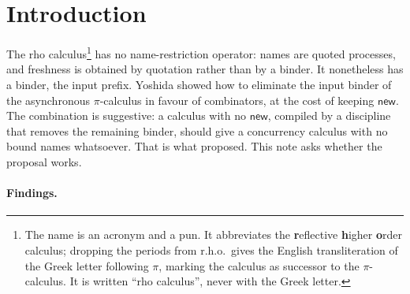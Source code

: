 \documentclass[11pt]{article}
\theoremstyle{plain}
\theoremstyle{definition}
\theoremstyle{remark}
\begin{document}
\tableofcontents

\section{Introduction}
\label{sec:intro}

The rho calculus\footnote{The name is an acronym and a pun. It abbreviates the
\textbf{r}eflective \textbf{h}igher \textbf{o}rder calculus; dropping the
periods from r.h.o.\ gives the English transliteration of the Greek letter
following $\pi$, marking the calculus as successor to the $\pi$-calculus. It
is written ``rho calculus'', never with the Greek letter.} has no
name-restriction operator: names are quoted processes, and freshness is
obtained by quotation rather than by a binder. It nonetheless has a binder,
the input prefix. Yoshida showed how to eliminate the input binder of the
asynchronous $\pi$-calculus in favour of combinators, at the cost of keeping
$\mathsf{new}$. The combination is suggestive: a calculus with no
$\mathsf{new}$, compiled by a discipline that removes the remaining binder,
should give a concurrency calculus with no bound names whatsoever. That is
what \cite{rhocomb} proposed. This note asks whether the proposal works.

\paragraph{Findings.}
\end{document}
